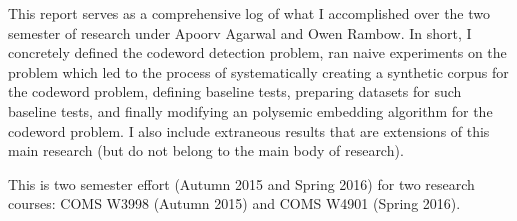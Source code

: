 This report serves as a comprehensive log of what I accomplished over the two semester of research under Apoorv Agarwal and Owen Rambow. In short, I concretely defined the codeword detection problem, ran naive experiments on the problem which led to the process of systematically creating a synthetic corpus for the codeword problem, defining baseline tests, preparing datasets for such baseline tests, and finally modifying an polysemic embedding algorithm for the codeword problem. I also include extraneous results that are extensions of this main research (but do not belong to the main body of research).

This is two semester effort (Autumn 2015 and Spring 2016) for two research courses: COMS W3998 (Autumn 2015) and COMS W4901 (Spring 2016).